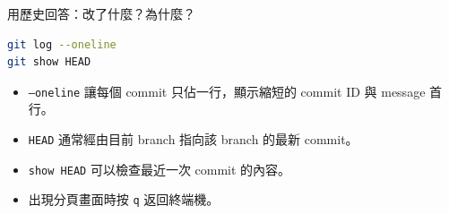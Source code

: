 \documentclass[xetex, unicode, 10pt, aspectratio=169]{beamer}
\begin{document}
\begin{frame}[fragile]{用歷史回答：改了什麼？為什麼？}
\begin{lstlisting}[language=bash]
git log --oneline
git show HEAD
\end{lstlisting}
    \begin{itemize}
        \item \texttt{--oneline} 讓每個 commit 只佔一行，顯示縮短的 commit ID 與 message 首行。
        \item \texttt{HEAD} 通常經由目前 branch 指向該 branch 的最新 commit。
        \item \texttt{show HEAD} 可以檢查最近一次 commit 的內容。
        \item 出現分頁畫面時按 \texttt{q} 返回終端機。
    \end{itemize}
\end{frame}
\end{document}
